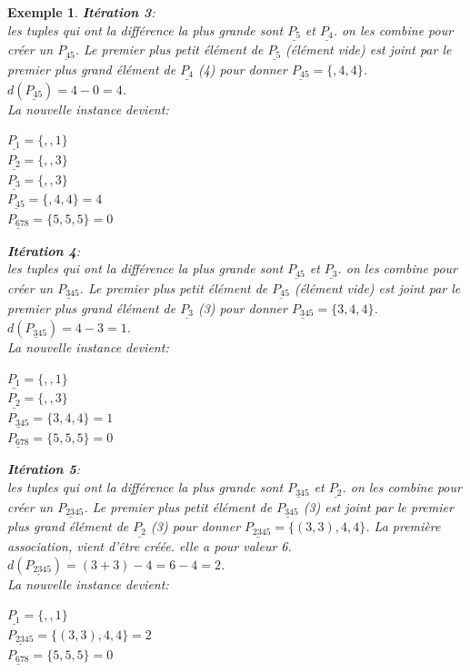 \documentclass[a4paper,12pt]{report}
\theoremstyle{plain}				%
\newtheorem{example}{Exemple}
\theoremstyle{definition}				%
\begin{document}
\begin{itemize}
\begin{example}
\textbf{Itération 3}:\\
les tuples qui ont la différence la plus grande sont
$\underline{P_{5}}$  et $\underline{P_{4}}$.
on les combine pour créer un $\underline{P_{45}}$. Le premier plus petit élément de $\underline{P_{5}}$ (élément vide) est joint par le premier plus grand élément de $\underline{P_{4}}$ (4) pour donner  $\underline{P_{45}} = \{,4,4\}$. $d(\underline{P_{45}}) = 4-0 = 4$.\\
La nouvelle instance devient:\\
\begin{multicols}{3}
$\underline{P_{1}} = \{,,1\}$\\
$\underline{P_{2}} = \{,,3\}$\\
$\underline{P_{3}} = \{,,3\}$\\
$\underline{P_{45}} = \{,4,4\}=4$\\
$\underline{P_{678}} = \{5,5,5\}=0$\\
\end{multicols}

\textbf{Itération 4}:\\
les tuples qui ont la différence la plus grande sont
$\underline{P_{45}}$  et $\underline{P_{3}}$.
on les combine pour créer un $\underline{P_{345}}$. Le premier plus petit élément de $\underline{P_{45}}$ (élément vide) est joint par le premier plus grand élément de $\underline{P_{3}}$ (3) pour donner  $\underline{P_{345}} = \{3,4,4\}$. $d(\underline{P_{345}}) = 4-3 = 1$.\\
La nouvelle instance devient:\\
\begin{multicols}{3}
$\underline{P_{1}} = \{,,1\}$\\
$\underline{P_{2}} = \{,,3\}$\\
$\underline{P_{345}} = \{3,4,4\}=1$\\
$\underline{P_{678}} = \{5,5,5\}=0$\\
\end{multicols}

\textbf{Itération 5}:\\
les tuples qui ont la différence la plus grande sont
$\underline{P_{345}}$  et $\underline{P_{2}}$.
on les combine pour créer un $\underline{P_{2345}}$. Le premier plus petit élément de $\underline{P_{345}}$ (3) est joint par le premier plus grand élément de $\underline{P_{2}}$ (3) pour donner  $\underline{P_{2345}} = \{(3,3),4,4\}$. La première association, vient d'être créée. elle a pour valeur 6.
$d(\underline{P_{2345}}) = (3+3)-4 = 6-4=2$.\\
La nouvelle instance devient:\\
\begin{multicols}{2}
$\underline{P_{1}} = \{,,1\}$\\
$\underline{P_{2345}} = \{(3,3),4,4\}=2$\\
$\underline{P_{678}} = \{5,5,5\}=0$\\
\end{multicols}


\end{example}
\end{itemize}
\end{document}
